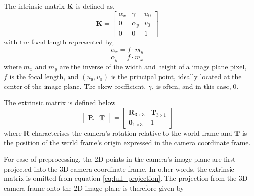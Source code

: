         The intrinsic matrix \(\bf{K}\) is defined as,
        \begin{equation} \label{eq:intrinsic}
            \bm{K} =
            \begin{bmatrix}
                \alpha_x & \gamma   & u_0 \\
                0        & \alpha_y & v_0 \\
                0        & 0        & 1
            \end{bmatrix}
        \end{equation}
        with the focal length represented by,
        \[\alpha_x = f \cdot m_y\]
        \[\alpha_y = f \cdot m_x\]
        where \(m_x\) and \(m_y\) are the inverse of the width and height of a image plane pixel, \(f\) is the focal length, and \((u_0,v_0)\) is the principal point, ideally located at the center of the image plane. The skew coefficient, \(\gamma\), is often, and in this case, 0.

        The extrinsic matrix is defined below
        \begin{equation}\label{eq:extrinsic}
            \begin{bmatrix}
                \bm{R} & \bm{T}
            \end{bmatrix}
            =
            \begin{bmatrix}
                \bm{R}_{3\times3} & \bm{T}_{3\times1} \\
                \bm{0}_{1\times3} & 1
            \end{bmatrix}
        \end{equation}
        where \(\bm{R}\) characterises the camera's rotation relative to the world frame and \(\bm{T}\) is the position of the world frame's origin expressed in the camera coordinate frame.

        For ease of preprocessing, the 2D points in the camera's image plane are first projected into the 3D camera coordinate frame. In other words, the extrinsic matrix is omitted from equation \ref{eq:full_projection}. The projection from the 3D camera frame onto the 2D image plane is therefore given by


